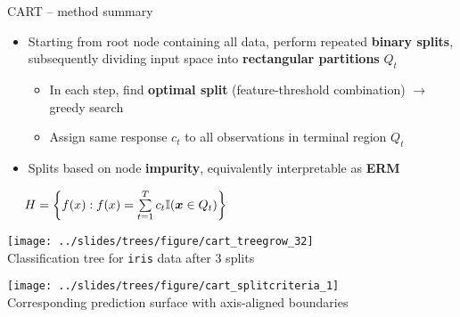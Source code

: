 \begin{frame}{CART -- method summary}

\footnotesize

 
  

\medskip

\begin{itemize}
  \item Starting from root node containing all data, perform repeated 
  \textbf{binary splits}, subsequently dividing input space into
  \textbf{rectangular partitions} $Q_t$
  \begin{itemize}
    \item In each step, find \textbf{optimal split} (feature-threshold 
    combination) $\rightarrow$ greedy search
    \item Assign same response $c_t$ to all observations in terminal region 
    $Q_t$
  \end{itemize}
  \item Splits based on node \textbf{impurity}, equivalently interpretable as 
  \textbf{ERM}
\end{itemize}

\medskip
 
 ~~
$H = \left\{ f(x): f(x) = \sum\limits_{t = 1}^T c_t \mathbb{I}(\bm{x} \in Q_t) 
\right\}$

\medskip

\begin{minipage}[b]{0.5\textwidth}
  \texttt{[image: ../slides/trees/figure/cart\_treegrow\_32]} \\
  \tiny{Classification tree for \texttt{iris} data after 3 splits}
\end{minipage}
\begin{minipage}[b]{0.49\textwidth}
  \centering
  \texttt{[image: 
  ../slides/trees/figure/cart\_splitcriteria\_1]} \\
  \tiny{Corresponding prediction surface with axis-aligned boundaries}
\end{minipage}%

\end{frame}


